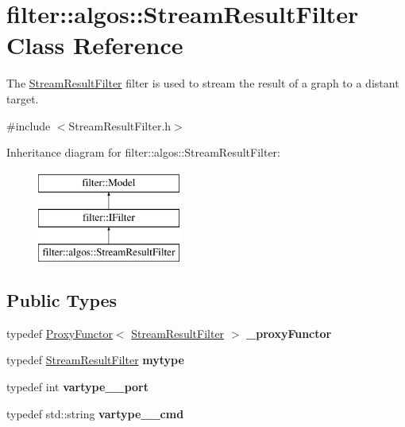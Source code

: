 \hypertarget{classfilter_1_1algos_1_1_stream_result_filter}{}\section{filter\+:\+:algos\+:\+:Stream\+Result\+Filter Class Reference}
\label{classfilter_1_1algos_1_1_stream_result_filter}


The \hyperlink{classfilter_1_1algos_1_1_stream_result_filter}{Stream\+Result\+Filter} filter is used to stream the result of a graph to a distant target.  




{\ttfamily \#include $<$Stream\+Result\+Filter.\+h$>$}

Inheritance diagram for filter\+:\+:algos\+:\+:Stream\+Result\+Filter\+:\begin{figure}[H]
\begin{center}
\leavevmode
\includegraphics[height=3.000000cm]{d5/d23/classfilter_1_1algos_1_1_stream_result_filter}
\end{center}
\end{figure}
\subsection*{Public Types}
\begin{DoxyCompactItemize}
\item 
\mbox{\label{classfilter_1_1algos_1_1_stream_result_filter_acb1dbead9c290e226e92092ad9a04941}} 
typedef \hyperlink{class_proxy_functor}{Proxy\+Functor}$<$ \hyperlink{classfilter_1_1algos_1_1_stream_result_filter}{Stream\+Result\+Filter} $>$ {\bfseries \+\_\+proxy\+Functor}
\item 
\mbox{\label{classfilter_1_1algos_1_1_stream_result_filter_ad9ca24328f75617dc70c36ed3c7a10b2}} 
typedef \hyperlink{classfilter_1_1algos_1_1_stream_result_filter}{Stream\+Result\+Filter} {\bfseries mytype}
\item 
\mbox{\label{classfilter_1_1algos_1_1_stream_result_filter_a5742f4055a195f3b815d59cfbaa3f549}} 
typedef int {\bfseries vartype\+\_\+\+\_\+port}
\item 
\mbox{\label{classfilter_1_1algos_1_1_stream_result_filter_a387a621a8eba762cc59a062aaa299c52}} 
typedef std\+::string {\bfseries vartype\+\_\+\+\_\+cmd}
\end{DoxyCompactItemize}
